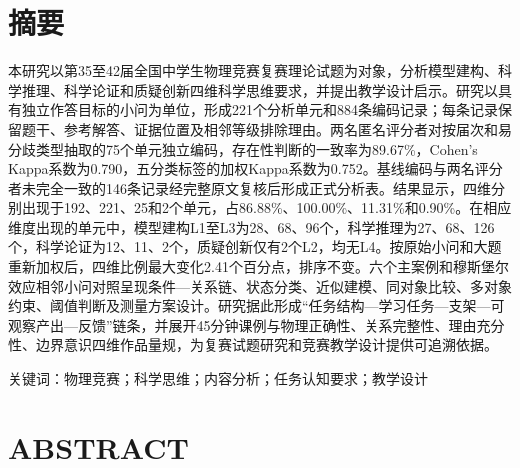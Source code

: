 \documentclass[
  12pt,
  a4paper,twoside,openany]{ctexbook}
\begin{document}
\clearpage
{}
\setcounter{page}{1}
\pagestyle{fancy}
\chapter*{摘要}\label{ux6458ux8981}

本研究以第35至42届全国中学生物理竞赛复赛理论试题为对象，分析模型建构、科学推理、科学论证和质疑创新四维科学思维要求，并提出教学设计启示。研究以具有独立作答目标的小问为单位，形成221个分析单元和884条编码记录；每条记录保留题干、参考解答、证据位置及相邻等级排除理由。两名匿名评分者对按届次和易分歧类型抽取的75个单元独立编码，存在性判断的一致率为89.67\%，Cohen's
Kappa系数为0.790，五分类标签的加权Kappa系数为0.752。基线编码与两名评分者未完全一致的146条记录经完整原文复核后形成正式分析表。结果显示，四维分别出现于192、221、25和2个单元，占86.88\%、100.00\%、11.31\%和0.90\%。在相应维度出现的单元中，模型建构L1至L3为28、68、96个，科学推理为27、68、126个，科学论证为12、11、2个，质疑创新仅有2个L2，均无L4。按原始小问和大题重新加权后，四维比例最大变化2.41个百分点，排序不变。六个主案例和穆斯堡尔效应相邻小问对照呈现条件---关系链、状态分类、近似建模、同对象比较、多对象约束、阈值判断及测量方案设计。研究据此形成``任务结构---学习任务---支架---可观察产出---反馈''链条，并展开45分钟课例与物理正确性、关系完整性、理由充分性、边界意识四维作品量规，为复赛试题研究和竞赛教学设计提供可追溯依据。

关键词：物理竞赛；科学思维；内容分析；任务认知要求；教学设计

\chapter*{ABSTRACT}\begingroup{}\label{abstract}
\end{document}
